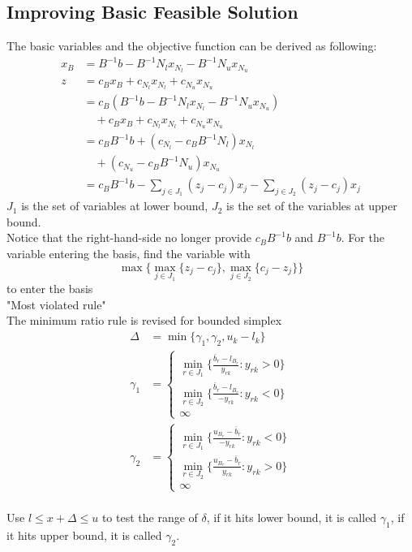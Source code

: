 				\subsection{Improving Basic Feasible Solution}
					The basic variables and the objective function can be derived as following:
					\begin{align}
						x_B &= B^{-1}b - B^{-1}N_lx_{N_l} - B^{-1}N_ux_{N_u} \\
						  z &= c_Bx_B + c_{N_l}x_{N_l} + c_{N_u}x_{N_u} \\
						  	&= c_B(B^{-1}b - B^{-1}N_lx_{N_l} - B^{-1}N_ux_{N_u})  \\
						  	& \quad + c_Bx_B + c_{N_l}x_{N_l} + c_{N_u}x_{N_u}\\
						  	&= c_BB^{-1}b + (c_{N_l} - c_BB^{-1}N_l)x_{N_l} \\
						  	& \quad + (c_{N_u} - c_BB^{-1}N_u)x_{N_u} \\
						  	&= c_BB^{-1}b - \sum_{j \in J_1}(z_j - c_j)x_j - \sum_{j \in J_2}(z_j - c_j)x_j
					\end{align}
					$J_1$ is the set of variables at lower bound, $J_2$ is the set of the variables at upper bound.\\
					Notice that the right-hand-side no longer provide $c_BB^{-1}b$ and $B^{-1}b$. For the variable entering the basis, find the variable with
					\begin{equation}
						\max\{\max_{j\in J_1}\{z_j - c_j\}, \max_{j\in J_2}\{c_j - z_j\}\} 
					\end{equation}
					to enter the basis\\
					 "Most violated rule"\\
					The minimum ratio rule is revised for bounded simplex
					\begin{align}
						\Delta &= \min \{\gamma_1, \gamma_2, u_k-l_k\} \\
						\gamma_1 &= \begin{cases}
										\min_{r\in J_1}\{\frac{\bar{b}_r-l_{B_r}}{y_{rk}}:y_{rk} > 0\} \\
										\min_{r\in J_2}\{\frac{\bar{b}_r-l_{B_r}}{-y_{rk}}:y_{rk} < 0\} \\
										\infty
									\end{cases} \\
						\gamma_2 &= \begin{cases}
										\min_{r\in J_1}\{\frac{u_{B_r} - \bar{b}_r}{-y_{rk}}:y_{rk} < 0\} \\
										\min_{r\in J_2}\{\frac{u_{B_r} - \bar{b}_r}{y_{rk}}:y_{rk} > 0\} \\
										\infty
									\end{cases} 
					\end{align}
					\\
					Use $l \le x+\Delta \le u$ to test the range of $\delta$, if it hits lower bound, it is called $\gamma_1$, if it hits upper bound, it is called $\gamma_2$.		

